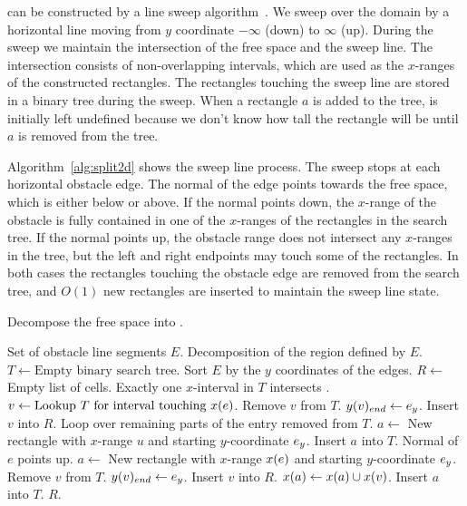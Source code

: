 \documentclass[english,gradu]{tktltiki2018}
\begin{document}
 can be constructed by a line sweep algorithm~\cite{dasnar}.
We sweep over the domain by a horizontal line moving from $y$ coordinate $-\infty$ (down) to $\infty$ (up).
During the sweep we maintain the intersection of the free space \fspace and the sweep line.
The intersection consists of non-overlapping intervals, which are used as the $x$-ranges of the constructed rectangles.
The rectangles touching the sweep line are stored in a binary tree during the sweep.
When a rectangle $a$ is added to the tree,  is initially left undefined because we don't know how tall the rectangle will be until $a$ is removed from the tree.

Algorithm~\ref{alg:split2d} shows the sweep line process.
The sweep stops at each horizontal obstacle edge.
The normal of the edge points towards the free space, which is either below or above.
If the normal points down, the $x$-range of the obstacle is fully contained in one of the $x$-ranges of the rectangles in the search tree.
If the normal points up, the obstacle range does not intersect any $x$-ranges in the tree, but the left and right endpoints may touch some of the rectangles.
In both cases the rectangles touching the obstacle edge are removed from the search tree, and $O(1)$ new rectangles are inserted to maintain the sweep line state.

\begin{algorithm}
\caption{Decompose the free space into .}\label{alg:split2d}
\begin{algorithmic}
\Require Set of obstacle line segments $E$.
\Output Decomposition  of the region defined by $E$.
\State $T\gets \text{Empty binary search tree}$.
\State Sort $E$ by the $y$ coordinates of the edges.
\State $R\gets$ Empty list of cells.
		\State \LComment Exactly one $x$-interval in $T$ intersects .
		\State $v\gets\text{Lookup $T$ for interval touching \ensuremath{x(e)}}$.
		\State Remove $v$ from $T$.
		\State $y(v)_{end}\gets{e}_y$.
		\State Insert $v$ into $R$.
		\State \LComment Loop over remaining parts of the entry removed from $T$.
			\State $a\gets$ New rectangle with $x$-range $u$ and starting $y$-coordinate ${e}_y$.
			\State Insert $a$ into $T$.
		\EndFor
	\Else\Comment Normal of $e$ points up.
		\State $a\gets$ New rectangle with $x$-range $x(e)$ and starting $y$-coordinate ${e}_y$.
			\State Remove $v$ from $T$.
			\State $y(v)_{end}\gets{e}_y$.
			\State Insert $v$ into $R$.
			\State $x(a)\gets x(a)\cup x(v)$.
		\EndFor
		\State Insert $a$ into $T$.
	\EndIf
\EndFor
\State \Return $R$.
\end{algorithmic}
\end{algorithm}
\end{document}
